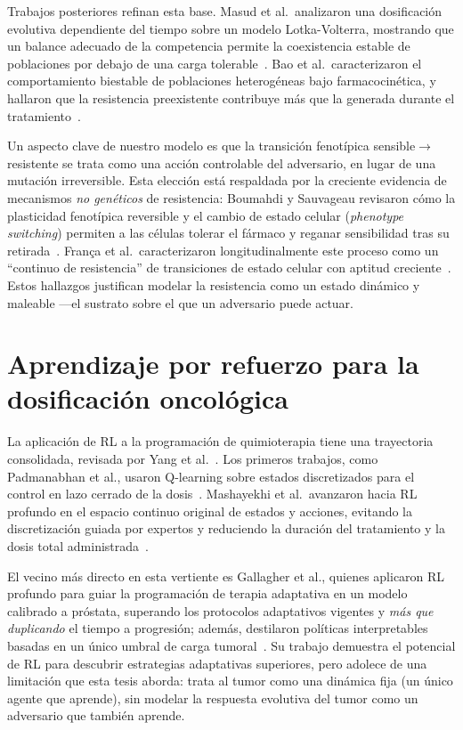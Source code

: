 Trabajos posteriores refinan esta base. Masud et al.\ analizaron una dosificación evolutiva dependiente del tiempo sobre un modelo Lotka-Volterra, mostrando que un balance adecuado de la competencia permite la coexistencia estable de poblaciones por debajo de una carga tolerable~\cite{Masud2024}. Bao et al.\ caracterizaron el comportamiento biestable de poblaciones heterogéneas bajo farmacocinética, y hallaron que la resistencia preexistente contribuye más que la generada durante el tratamiento~\cite{Bao2023}.

Un aspecto clave de nuestro modelo es que la transición fenotípica sensible$\rightarrow$resistente se trata como una acción controlable del adversario, en lugar de una mutación irreversible. Esta elección está respaldada por la creciente evidencia de mecanismos \emph{no genéticos} de resistencia: Boumahdi y Sauvageau revisaron cómo la plasticidad fenotípica reversible y el cambio de estado celular (\emph{phenotype switching}) permiten a las células tolerar el fármaco y reganar sensibilidad tras su retirada~\cite{Boumahdi2019}. França et al.\ caracterizaron longitudinalmente este proceso como un ``continuo de resistencia'' de transiciones de estado celular con aptitud creciente~\cite{Franca2024}. Estos hallazgos justifican modelar la resistencia como un estado dinámico y maleable ---el sustrato sobre el que un adversario puede actuar.

\section{Aprendizaje por refuerzo para la dosificación oncológica}
\label{sec:rl-dosificacion}

La aplicación de RL a la programación de quimioterapia tiene una trayectoria consolidada, revisada por Yang et al.~\cite{Yang2022}. Los primeros trabajos, como Padmanabhan et al., usaron Q-learning sobre estados discretizados para el control en lazo cerrado de la dosis~\cite{Padmanabhan2017}. Mashayekhi et al.\ avanzaron hacia RL profundo en el espacio continuo original de estados y acciones, evitando la discretización guiada por expertos y reduciendo la duración del tratamiento y la dosis total administrada~\cite{Mashayekhi2023}.

El vecino más directo en esta vertiente es Gallagher et al., quienes aplicaron RL profundo para guiar la programación de terapia adaptativa en un modelo calibrado a próstata, superando los protocolos adaptativos vigentes y \emph{más que duplicando} el tiempo a progresión; además, destilaron políticas interpretables basadas en un único umbral de carga tumoral~\cite{Gallagher2024}. Su trabajo demuestra el potencial de RL para descubrir estrategias adaptativas superiores, pero adolece de una limitación que esta tesis aborda: trata al tumor como una dinámica fija (un único agente que aprende), sin modelar la respuesta evolutiva del tumor como un adversario que también aprende.

